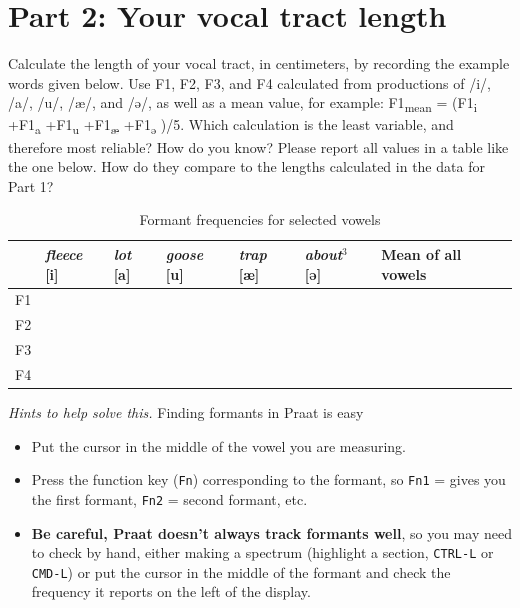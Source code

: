 \documentclass[12pt, letterpaper]{article}
\begin{document}
\section*{Part 2: Your vocal tract length} \label{sec:spectra}

Calculate the length of your vocal tract, in centimeters, by recording the example words given below. Use F1, F2, F3, and F4 calculated from productions of /i/, /a/, /u/, /æ/, and /ə/, as well as a mean value, for example: F1\textsubscript{mean} = (F1\textsubscript{i} +F1\textsubscript{a} +F1\textsubscript{u} +F1\textsubscript{æ} +F1\textsubscript{ə} )/5. Which calculation is the least variable, and therefore most reliable? How do you know? Please report all values in a table like the one below. How do they compare to the lengths calculated in the data for Part 1?

\begin{table}[h!]
\renewcommand{\arraystretch}{1.3}
\caption{Formant frequencies for selected vowels}
\centering
\begin{tabularx}{\textwidth}{|c|X|X|X|X|X|X|}
\hline
 & \textit{fleece} [i] & \textit{lot} [a] & \textit{goose} [u] & \textit{trap} [æ] & \textit{about}$^{3}$ [ə] & Mean of all vowels \\
\hline
F1 &  &  &  &  &  &  \\
\hline
F2 &  &  &  &  &  &  \\
\hline
F3 &  &  &  &  &  &  \\
\hline
F4 &  &  &  &  &  &  \\
\hline
\end{tabularx}
\end{table}

\textit{Hints to help solve this.}
Finding formants in Praat is easy
\begin{itemize}
    \item Put the cursor in the middle of the vowel you are measuring.
    \item Press the function key (\texttt{Fn}) corresponding to the formant, so \texttt{Fn1} = gives you the first formant, \texttt{Fn2} = second formant, etc.
    \item \textbf{Be careful, Praat doesn’t always track formants well}, so you may need to check by hand, either making a spectrum (highlight a section, \texttt{CTRL-L} or \texttt{CMD-L}) or put the cursor in the middle of the formant and check the frequency it reports on the left of the display.
\end{itemize}
\end{document}
